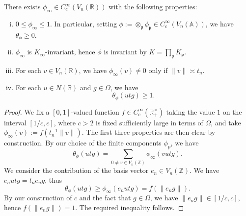 \begin{lemma}\label{lem:sub-gln:let-r-be}
  There exists $\phi_\infty \in C_c^\infty(V_n(\mathbb{R}))$ with the following properties:
  \begin{enumerate}[(i)]
  \item $0 \leq \phi_\infty \leq 1$.  In particular, setting $\phi := \otimes_{\mathfrak{p}} \phi_\mathfrak{p} \in C_c^\infty(V_n(\mathbb{A}))$, we have $\theta_{\phi} \geq 0$.
  \item $\phi_\infty$ is $K_\infty$-invariant, hence $\phi$ is invariant by $K = \prod_\mathfrak{p} K_\mathfrak{p}$.
  \item For each $v \in V_n(\mathbb{R})$, we have $\phi_\infty(v) \neq 0$ only if $\|v\| \asymp t_n$.
  \item For each $u \in N(\mathbb{R})$ and $g \in \Omega$, we have
    \begin{equation}\label{eq:theta_phiu-r-g}
      \theta_\phi(u t g) \geq 1.
    \end{equation}
  \end{enumerate}
\end{lemma}
\begin{proof}
  We fix a $[0,1]$-valued function $f \in C_c^\infty(\mathbb{R}^\times_+)$ taking the value $1$ on the interval $[1/c,c]$, where $c > 2$ is fixed sufficiently large in terms of $\Omega$, and take $\phi_\infty(v) := f(t_n^{-1} \|v\|)$.  The first three properties are then clear by construction.  By our choice of the finite components $\phi_p$, we have
  \begin{equation*}
    \theta_\phi(u t g) = \sum_{0 \neq v \in V_n(\mathbb{Z})}
    \phi_\infty(v u t g).
  \end{equation*}
  We consider the contribution of the basis vector $e_n \in V_n(\mathbb{Z})$.  We have $e_n u t g = t_n e_n g$, thus
  \begin{equation*}
    \theta_\phi(u t g) \geq \phi_\infty(e_n u t g)
    = f(\|e_n g\|).
  \end{equation*}
  By our construction of $c$ and the fact that $g \in \Omega$, we have $\|e_n g\| \in [1/c,c]$, hence $f( \|e_n g\|) = 1$.  The required inequality follows.
\end{proof}

